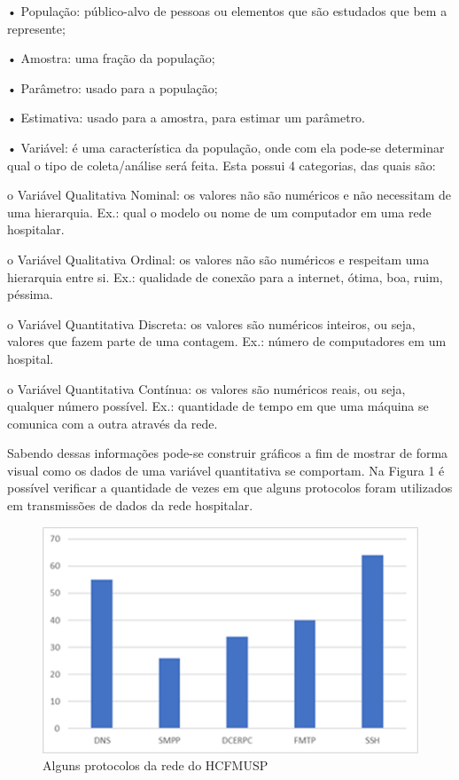 \documentclass[
	12pt,				%
	openright,			%
	twoside,			%
	a4paper,			%
	english,			%
	french,				%
	spanish,			%
	brazil				%
	]{abntex2}
\begin{document}
•	População: público-alvo de pessoas ou elementos que são estudados que bem a represente;

•	Amostra: uma fração da população;

•	Parâmetro: usado para a população;

•	Estimativa: usado para a amostra, para estimar um parâmetro.

•	Variável: é uma característica da população, onde com ela pode-se determinar qual o tipo de coleta/análise será feita. Esta possui 4 categorias, das quais são:

o	Variável Qualitativa Nominal: os valores não são numéricos e não necessitam de uma hierarquia. Ex.: qual o modelo ou nome de um computador em uma rede hospitalar.

o	Variável Qualitativa Ordinal: os valores não são numéricos e respeitam uma hierarquia entre si. Ex.: qualidade de conexão para a internet, ótima, boa, ruim, péssima.

o	Variável Quantitativa Discreta: os valores são numéricos inteiros, ou seja, valores que fazem parte de uma contagem. Ex.: número de computadores em um hospital.

o	Variável Quantitativa Contínua: os valores são numéricos reais, ou seja, qualquer número possível. Ex.: quantidade de tempo em que uma máquina se comunica com a outra através da rede.

Sabendo dessas informações pode-se construir gráficos a fim de mostrar de forma visual como os dados de uma variável quantitativa se comportam. Na Figura 1 é possível verificar a quantidade de vezes em que alguns protocolos foram utilizados em transmissões de dados da rede hospitalar.


\begin{figure}[htbp]
\hypertarget{arquitetura}{%
\caption{Alguns protocolos da rede do HCFMUSP}\label{arquitetura}
\begin{center}
\includegraphics{Figuras/Figura 1 - Alguns protocolos da rede do HCFMUSP.png}
\end{center}
}
\end{figure}
\end{document}
